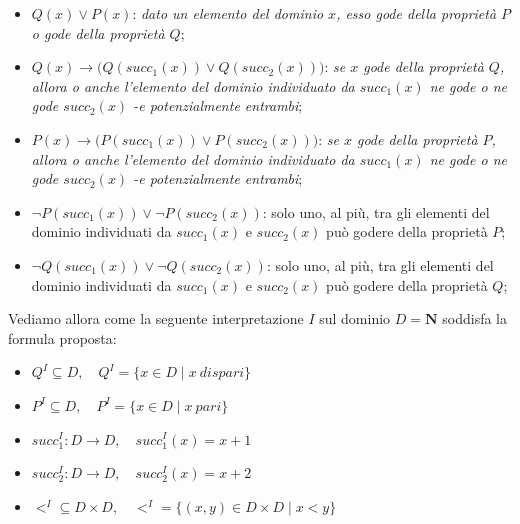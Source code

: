 \documentclass[a4paper,10pt]{article}
\begin{document}
{\begin{itemize}[label=, leftmargin=0pt]
\begin{osservazioni}
    \begin{itemize}
        \item $Q(x) \lor P(x)$: \textit{dato un elemento del dominio $x$, esso gode della proprietà $P$ o gode della proprietà $Q$};
        \item $Q(x)\rightarrow \bigg( Q(succ_1(x)) \lor Q(succ_2(x))\bigg)$: \textit{se $x$ gode della proprietà $Q$, allora o anche l'elemento del dominio individuato da $succ_1(x)$ ne gode o ne gode $succ_2(x)$ -e potenzialmente entrambi};
        \item $P(x)\rightarrow \bigg( P(succ_1(x)) \lor P(succ_2(x))\bigg)$: \textit{se $x$ gode della proprietà $P$, allora o anche l'elemento del dominio individuato da $succ_1(x)$ ne gode o ne gode $succ_2(x)$ -e potenzialmente entrambi};
        \item $\lnot P(succ_1(x)) \lor \lnot P(succ_2(x))$: solo uno, al più, tra gli elementi del dominio individuati da $succ_1(x)$ e $succ_2(x)$ può godere della proprietà $P$;
        \item $\lnot Q(succ_1(x)) \lor \lnot Q(succ_2(x))$: solo uno, al più, tra gli elementi del dominio individuati da $succ_1(x)$ e $succ_2(x)$ può godere della proprietà $Q$;
    \end{itemize}
    Vediamo allora come la seguente interpretazione $I$ sul dominio $D=\mathbf{N}$ soddisfa la formula proposta:
    \begin{itemize}
        \item $Q^I \subseteq D,\quad Q^I=\{x \in D\mid x\ dispari\}$
        \item $P^I \subseteq D,\quad P^I=\{x \in D\mid x\ pari \}$
        \item $succ_1^I:D\rightarrow D,\quad succ_1^I(x)=x+1$
        \item $succ_2^I:D\rightarrow D,\quad succ_2^I(x)=x+2$
        \item $<^I \subseteq D\times D,\quad <^I=\{(x,y) \in D\times D \mid x<y\}$\\
    \end{itemize}
    

    

    
    \end{osservazioni}


\end{itemize}}
\end{document}
